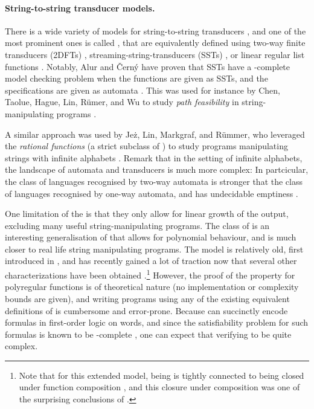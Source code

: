 \paragraph{String-to-string transducer models.} There is a wide variety of
models for string-to-string transducers \cite{MUSC19}, and one of the most
prominent ones is called , that are
equivalently defined using two-way finite transducers (2DFTs)
\cite{RASCO59}, streaming-string-transducers (SSTs) \cite{ALUR11}, or linear
regular list functions \cite{BDK18}. Notably, Alur and Černý have proven
that SSTs have a \PSPACE-complete model checking problem when the functions are
given as SSTs, and the specifications are given as automata
\cite[Theorem 13]{ALCE11}. This was used for instance by Chen, Taolue, Hague,
Lin, Rümer, and Wu to study \emph{path feasibility} in string-manipulating
programs \cite{CHLRW19}.

A similar approach was used by Jeż, Lin, Markgraf, and Rümmer, who leveraged
the \emph{rational functions} (a strict subclass of ) to study programs manipulating strings with infinite alphabets
\cite{KAFR94}. Remark that in the setting of infinite alphabets, the landscape
of automata and transducers is much more complex: In partcicular, the class of
languages recognised by two-way automata is stronger that the class of
languages recognised by one-way automata, and has undecidable emptiness
\cite[Figure 1.1]{BOJA19}.

\AP One limitation of the  is that they only 
allow for linear growth of the output, excluding many useful string-manipulating 
programs. The class of  is an interesting 
generalisation of  that allows for polynomial behaviour, 
and is much closer to real life string manipulating programs. The model 
is relatively old, first introduced in \cite{ENMA02},
and has recently gained a lot of traction now that
several other characterizations have been obtained
\cite{bojanczyk2018polyregular,bojanczyk2019string}.\footnote{Note that for this extended model, being
   is tightly connected to being closed under
function composition \cite[Proposition III.3]{FIRELH25}, and this closure under
composition was one of the surprising conclusions of
\cite{bojanczyk2018polyregular}.} However, the proof of the  property for polyregular functions is of theoretical nature (no
implementation or complexity bounds are given), and writing programs using any
of the existing equivalent definitions of  is
cumbersome and error-prone. Because  can succinctly
encode formulas in first-order logic on words, and
since the satisfiability problem for such formulas is known to be
\TOWER-complete \cite[Theorem 13.5]{REINH02}, one can expect that verifying
 to be quite complex.


